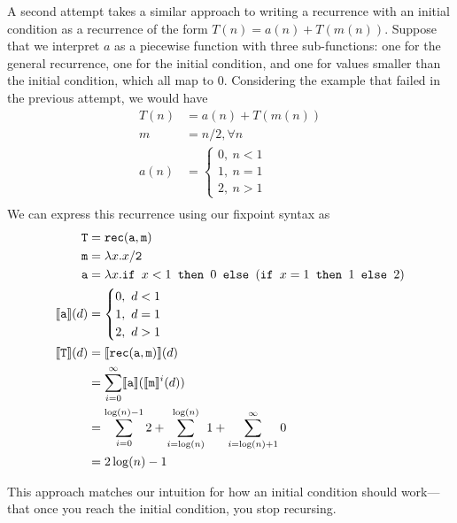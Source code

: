 A second attempt takes a similar approach to writing a recurrence with an initial condition as a recurrence of 
the form $T(n) = a(n) + T(m(n))$. Suppose that we interpret $a$ as a piecewise function with three sub-functions:
one for the general recurrence, one for the initial condition, and one for values smaller than the initial condition, which all
map to $0$. Considering the example that failed in the previous attempt, we would have
\begin{align*}
T(n) &= a(n) + T(m(n)) \\
m &= n/2, \forall n \\
a(n) &=
\begin{cases}
0, \ n < 1 \\
1, \ n = 1 \\
2, \ n > 1
\end{cases} \\
\end{align*}
We can express this recurrence using our fixpoint syntax as
\begin{align*}
\texttt{T} &= \texttt{rec}(\texttt{a},\texttt{m}) \\
\texttt{m} &= \lambda x.x/\texttt{2} \\
\texttt{a} &= \lambda x.\texttt{if } x <1 \texttt{ then } 0 \texttt{ else } (\texttt{if } x = 1 \texttt{ then } 1 \texttt{ else } 2) \\
\llbracket \texttt{a} \rrbracket(d) &= 
 \begin{cases}
0, \ d < 1 \\
1, \ d = 1 \\
2, \ d > 1 
\end{cases} \\
\llbracket \texttt{T} \rrbracket(d) &= \llbracket \texttt{rec}(\texttt{a},\texttt{m})\rrbracket(d) \\
&= \sum_{i=0}^{\infty}\llbracket \texttt{a} \rrbracket(\llbracket \texttt{m}\rrbracket^i(d)) \\
&= \sum_{i=0}^{\log(n)-1} 2 + \sum_{i=\log(n) }^{\log(n)} 1 + \sum_{i = \log(n) + 1}^{\infty} 0 \\
&= 2\log(n) - 1
\end{align*}

This approach matches our intuition for how an initial condition should work---that once you reach the initial condition,
you stop recursing. 

 